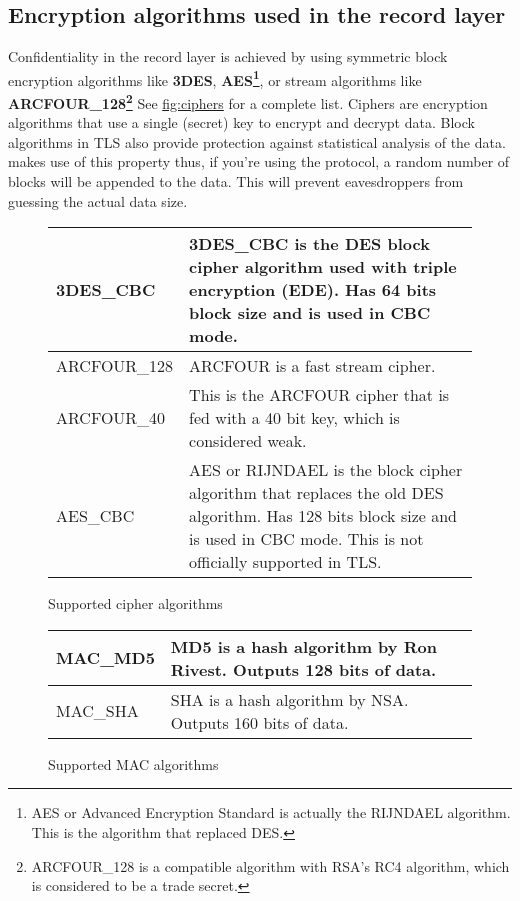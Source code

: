 \subsection{Encryption algorithms used in the record layer}
Confidentiality in the record layer is achieved by using symmetric block 
encryption algorithms like {\bf 3DES}, {\bf AES\footnote{AES or Advanced 
Encryption Standard is actually the RIJNDAEL algorithm. This is the
algorithm that replaced DES.}}, or
stream algorithms like {\bf ARCFOUR\_128\footnote{ARCFOUR\_128 is a compatible
algorithm with RSA's RC4 algorithm, which is considered to be a trade secret.}} See \hyperref{fig:ciphers}{figure }{}{fig:ciphers} for a complete list. 
Ciphers are encryption algorithms that use a single (secret) key
to encrypt and decrypt data. Block algorithms in TLS also provide protection
against statistical analysis of the data. \gnutls{} makes use of this property
thus, if you're using the \tlsI{} protocol, a random number of blocks will be
appended to the data. This will prevent eavesdroppers from guessing the 
actual data size.

\begin{figure}[hbtp]
\begin{tabular}{|l|p{9cm}|}

\hline
3DES\_CBC & 3DES\_CBC is the DES block cipher algorithm used with triple
encryption (EDE). Has 64 bits block size and is used in CBC mode.
\\
\hline
ARCFOUR\_128 & ARCFOUR is a fast stream cipher.
\\
\hline
ARCFOUR\_40 & This is the ARCFOUR cipher that is fed with a 40 bit key,
which is considered weak.
\\
\hline
AES\_CBC & AES or RIJNDAEL is the block cipher algorithm that replaces 
the old DES algorithm. Has
128 bits block size and is used in CBC mode. This is not officially
supported in TLS.
\\
\hline
\end{tabular}
\caption{Supported cipher algorithms}
\label{fig:ciphers}
\end{figure}



\addvspace{1.5cm}

\begin{figure}[hbtp]
\begin{tabular}{|l|p{9cm}|}

\hline
MAC\_MD5 & MD5 is a hash algorithm by Ron Rivest. Outputs 128 bits of data.
\\
\hline
MAC\_SHA & SHA is a hash algorithm by NSA. Outputs 160 bits of data.
\\
\hline
\end{tabular}
\caption{Supported MAC algorithms}
\label{fig:mac}
\end{figure}

